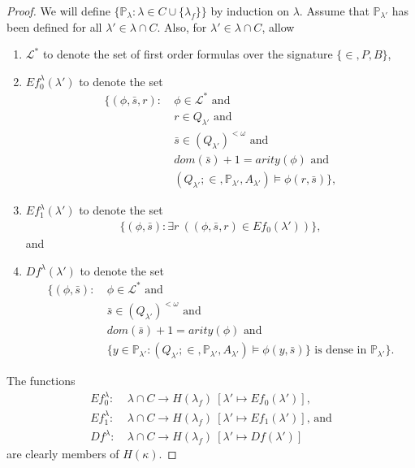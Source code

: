 \documentclass[12pt]{article}
\numberwithin{equation}{section}
\begin{document}
\begin{proof}
We will define $\{\mathbb{P}_{\lambda} : \lambda \in C \cup \{\lambda_f\}\}$ by induction on $\lambda$. Assume that $\mathbb{P}_{\lambda'}$ has been defined for all $\lambda' \in \lambda \cap C$. Also, for $\lambda' \in \lambda \cap C$, allow 
\begin{enumerate}[label=(\Alph*)]
    \item $\mathcal{L^*}$ to denote the set of first order formulas over the signature $\{\in, P, B\}$,
    \item $Ef_0^{\lambda}(\lambda')$ to denote the set 
    \begin{align*}
        \{(\phi, \bar{s}, r) : \ & \phi \in \mathcal{L}^* \text{ and} \\
        & r \in Q_{\lambda'} \text{ and} \\
        & \bar{s} \in (Q_{\lambda'})^{< \omega} \text{ and} \\
        & dom(\bar{s}) + 1 = arity(\phi) \text{ and} \\
        & (Q_{\lambda'}; \in, \mathbb{P}_{\lambda'}, A_{\lambda'}) \models \phi(r, \bar{s})\},
    \end{align*}
    \item $Ef_1^{\lambda}(\lambda')$ to denote the set
    \begin{align*}
        \{(\phi, \bar{s}) : \exists r \ ((\phi, \bar{s}, r) \in Ef_0(\lambda'))\},
    \end{align*}
    and
    \item $Df^{\lambda}(\lambda')$ to denote the set 
    \begin{align*}
        \{(\phi, \bar{s}) : \ & \phi \in \mathcal{L}^* \text{ and} \\
        & \bar{s} \in (Q_{\lambda'})^{< \omega} \text{ and} \\
        & dom(\bar{s}) + 1 = arity(\phi) \text{ and} \\
        & \{y \in \mathbb{P}_{\lambda'} : (Q_{\lambda'}; \in, \mathbb{P}_{\lambda'}, A_{\lambda'}) \models \phi(y, \bar{s})\} \text{ is dense in } \mathbb{P}_{\lambda'}\}.
    \end{align*}
\end{enumerate}
The functions 
\begin{align*}
    Ef_0^{\lambda} : \ & \lambda \cap C \longrightarrow H(\lambda_f) \ [\lambda' \mapsto Ef_0(\lambda')] \text{,} \\
    Ef_1^{\lambda} : \ & \lambda \cap C \longrightarrow H(\lambda_f) \ [\lambda' \mapsto Ef_1(\lambda')] \text{, and}  \\
    Df^{\lambda} : \ & \lambda \cap C \longrightarrow H(\lambda_f) \ [\lambda' \mapsto Df(\lambda')]
\end{align*}
are clearly members of $H(\kappa)$.


\end{proof}
\end{document}
